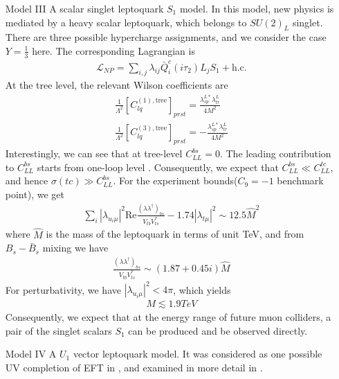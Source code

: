 \documentclass[a4paper,11pt]{article}
\begin{document}
\begin{enumerate}
    \item[Model III] A scalar singlet leptoquark $S_1$ model.
        In this model, new physics is mediated by a heavy scalar leptoquark, which belongs to $SU(2)_{L}$ singlet.
        There are three possible hypercharge assignments,
        and we consider the case $Y=\frac{1}{3}$ here.
        The corresponding Lagrangian is
        \begin{align}
            \mathcal{L}_{NP}=\sum_{i,j}\lambda_{ij}\bar{Q}^c_i(i\tau_2)L_jS_1+\textrm{h.c.}
        \end{align}
        At the tree level, the relevant Wilson coefficients are
        \begin{align}
            \frac{1}{\Lambda^2}[C_{lq}^{(1),\textrm{tree}}]_{prst}=\frac{\lambda_{sp}^{L*}\lambda_{tr}^{L}}{4M^2}\\
            \frac{1}{\Lambda^2}[C_{lq}^{(3),\textrm{tree}}]_{prst}=-\frac{\lambda_{sp}^{L*}\lambda_{tr}^{L}}{4M^2}
        \end{align}
        Interestingly, we can see that at tree-level $C_{LL}^{bs}=0$.
        The leading contribution to $C_{LL}^{bs}$ starts from one-loop level \cite{Bauer:2015knc}.
        Consequently, we expect that $C_{LL}^{bs}\ll C_{LL}^{tc}$,
        and hence $\sigma(tc)\gg C_{LL}^{bs}$.
        For the experiment bounds($C_9=-1$ benchmark point), we get
        \begin{align}
            \sum_{i}|\lambda_{u_i\mu}|^2\mathrm{Re}\frac{(\lambda\lambda^{\dag})_{bs}}{V_{tb}V_{ts}^{*}}-1.74|\lambda_{t\mu}|^2\sim 12.5\hat{M}^2
        \end{align}
        where $\hat{M}$ is the mass of the leptoquark in terms of unit TeV,
        and from $B_s-\bar{B}_s$ mixing we have
        \begin{align}
            \frac{(\lambda\lambda^{\dag})_{bs}}{V_{tb}V_{ts}^{*}}\sim(1.87+0.45i)\hat{M}
        \end{align}
        For perturbativity, we have $|\lambda_{u_i\mu}|^2<4\pi$, which yields
        \begin{align}
            M\lesssim 1.9\si{TeV}
        \end{align}
        Consequently, we expect that at the energy range of future muon colliders, a pair of the singlet scalars $S_1$  can be produced and be observed directly.
    \item[Model IV] A $U_1$ vector leptoquark model. It was considered as one possible UV completion of EFT in \cite{Calibbi:2015kma}, and examined in more detail in \cite{Barbieri:2015yvd,Calibbi:2017qbu,Blanke:2018sro,Buttazzo:2017ixm}.

\end{enumerate}
\end{document}
